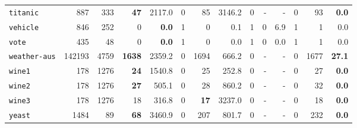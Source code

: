 \begin{tabular}{lccrrrrrrrrrrr}
\texttt{titanic} & \multicolumn{1}{r}{887} & \multicolumn{1}{r}{333}  & \textbf{47} & 2117.0 & 0 & 85 & 3146.2 & 0 & - & - & 0 & 93 & \textbf{0.0}\\
\texttt{vehicle} & \multicolumn{1}{r}{846} & \multicolumn{1}{r}{252}  & 0 & \textbf{0.0} & 1 & 0 & 0.1 & 1 & 0 & 6.9 & 1 & 1 & 0.0\\
\texttt{vote} & \multicolumn{1}{r}{435} & \multicolumn{1}{r}{48}  & 0 & \textbf{0.0} & 1 & 0 & 0.0 & 1 & 0 & 0.0 & 1 & 1 & 0.0\\
\texttt{weather-aus} & \multicolumn{1}{r}{142193} & \multicolumn{1}{r}{4759}  & \textbf{1638} & 2359.2 & 0 & 1694 & 666.2 & 0 & - & - & 0 & 1677 & \textbf{27.1}\\
\texttt{wine1} & \multicolumn{1}{r}{178} & \multicolumn{1}{r}{1276}  & \textbf{24} & 1540.8 & 0 & 25 & 252.8 & 0 & - & - & 0 & 27 & \textbf{0.0}\\
\texttt{wine2} & \multicolumn{1}{r}{178} & \multicolumn{1}{r}{1276}  & \textbf{27} & 505.1 & 0 & 28 & 860.2 & 0 & - & - & 0 & 32 & \textbf{0.0}\\
\texttt{wine3} & \multicolumn{1}{r}{178} & \multicolumn{1}{r}{1276}  & 18 & 316.8 & 0 & \textbf{17} & 3237.0 & 0 & - & - & 0 & 18 & \textbf{0.0}\\
\texttt{yeast} & \multicolumn{1}{r}{1484} & \multicolumn{1}{r}{89}  & \textbf{68} & 3460.9 & 0 & 207 & 801.7 & 0 & - & - & 0 & 232 & \textbf{0.0}\\
\bottomrule
\end{tabular}
